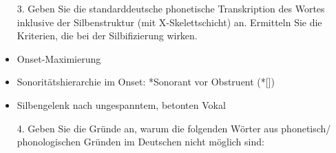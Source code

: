 {%

\begin{frame}
	\begin{itemize}	
		\item[3.] Geben Sie die standarddeutsche phonetische Transkription des Wortes  inklusive der Silbenstruktur (mit X-Skelettschicht) an. Ermitteln Sie die Kriterien, die bei der Silbifizierung wirken.
	\end{itemize}
		
		\begin{minipage}{.5\textwidth}
			\begin{figure}
			\end{figure}
		\end{minipage}
	\begin{minipage}{.45\textwidth}
		\begin{itemize}
			\item Onset-Maximierung
			\item Sonoritätshierarchie im Onset: *Sonorant vor Obstruent (*[])
			\item Silbengelenk nach ungespanntem, betonten Vokal
		\end{itemize}
	\end{minipage}

\end{frame}


\begin{frame}
	\begin{itemize}
					
		\item[4.] Geben Sie die Gründe an, warum die folgenden Wörter aus phonetisch/ phonologischen Gründen im Deutschen nicht möglich sind:
			
		\begin{exe}
			\exi{(\ref{ex:HA3})}
			\begin{xlist}
\ex[*]{\textipa{[a\;R.'tUng]}: \textcolor{red}{Auslautverhärtung, regressive velarare nasale Assimilation, Knacklaut}}
			\end{xlist}

		\end{exe}
	
	\end{itemize}
		
\end{frame}
	
}%


